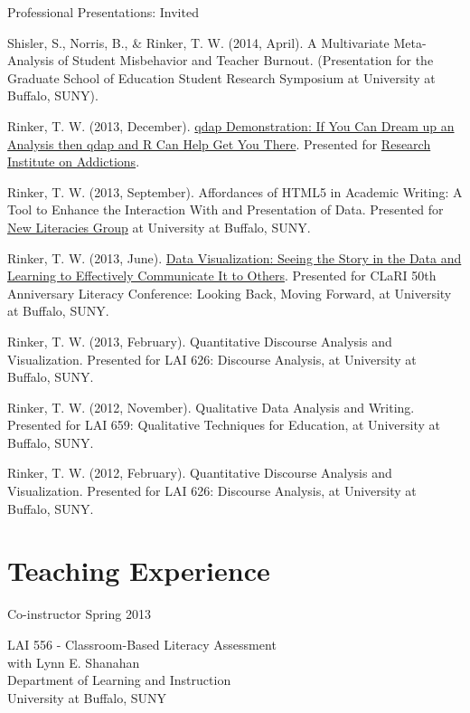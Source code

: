 Professional Presentations: Invited
\begin{innerlist}
    \item Shisler, S., Norris, B., \& Rinker, T. W. (2014, April). A Multivariate Meta-Analysis of Student Misbehavior and Teacher Burnout. (Presentation for the Graduate School of Education Student Research Symposium at University at Buffalo, SUNY).
    \item Rinker, T. W. (2013, December). \href{http://rpubs.com/trinker/11429}{qdap Demonstration: If You Can Dream up an Analysis then qdap and R Can Help Get You There}.  Presented for \href{http://www.buffalo.edu/ria.html}{Research Institute on Addictions}.
    \item Rinker, T. W. (2013, September). Affordances of HTML5 in Academic Writing: A Tool to Enhance the Interaction With and Presentation of Data.  Presented for \href{http://gse.buffalo.edu/org/nlg/}{New Literacies Group} at University at Buffalo, SUNY.
    \item Rinker, T. W. (2013, June). \href{http://www.youtube.com/watch?v=IHHPO4VhucY}{Data Visualization: Seeing the Story in the Data and Learning to Effectively Communicate It to Others}.  Presented for CLaRI 50th Anniversary Literacy Conference: Looking Back, Moving Forward, at University at Buffalo, SUNY.
	\item Rinker, T. W. (2013, February). Quantitative Discourse Analysis and Visualization. Presented for LAI 626: Discourse Analysis, at University at Buffalo, SUNY.
	\item Rinker, T. W. (2012, November). Qualitative Data Analysis and Writing. Presented for LAI 659: Qualitative Techniques for Education, at University at Buffalo, SUNY.
	\item Rinker, T. W. (2012, February). Quantitative Discourse Analysis and Visualization. Presented for LAI 626: Discourse Analysis, at University at Buffalo, SUNY.
\end{innerlist}

\section{Teaching Experience}

Co-instructor \hfill {Spring 2013}
\begin{innerlist}
\item[] LAI 556 - Classroom-Based Literacy Assessment\\
        with Lynn E. Shanahan\\
        Department of Learning and Instruction\\
        University at Buffalo, SUNY
\end{innerlist}

